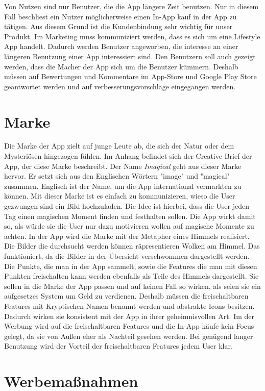 Von Nutzen sind nur Benutzer, die die App längere Zeit benutzen. Nur in diesem Fall beschliest ein Nutzer möglicherweise einen In-App kauf in der App zu tätigen. Aus diesem Grund ist die Kundenbindung sehr wichtig für unser Produkt. Im Marketing muss kommuniziert werden, dass es sich um eine Lifestyle App handelt. Dadurch werden Benutzer angeworben, die interesse an einer längeren Benutzung einer App interessiert sind.
Den Benutzern soll auch gezeigt werden, dass die Macher der App sich um die Benutzer kümmern. Deshalb müssen auf Bewertungen und Kommentare im App-Store und Google Play Store geantwortet werden und auf verbesserungsvorschläge eingegangen werden.

\section{Marke}

Die Marke der App zielt auf junge Leute ab, die sich der Natur oder dem Mysteriösen hingezogen fühlen. Im Anhang befindet sich der Creative Brief der App, der diese Marke beschreibt.
Der Name \textit{Imagical} geht aus dieser Marke hervor. Er setzt sich aus den Englischen Wörtern "image" und "magical" zusammen. Englisch ist der Name, um die App international vermarkten zu können.
Mit dieser Marke ist es einfach zu kommunizieren, wieso die User gezwungen sind ein Bild hochzuladen. Die Idee ist hierbei, dass die User jeden Tag einen magischen Moment finden und festhalten sollen. Die App wirkt damit so, als würde sie die User nur dazu motivieren wollen auf magische Momente zu achten.
In der App wird die Marke mit der Metapher eines Himmels realisiert. Die Bilder die durchsucht werden können räpresentieren Wolken am Himmel. Das funktioniert, da die Bilder in der Übersicht verschwommen dargestellt werden. Die Punkte, die man in der App sammelt, sowie die Features die man mit diesen Punkten freischalten kann werden ebenfalls als Teile des Himmels dargestellt. Sie sollen in die Marke der App passen und auf keinen Fall so wirken, als seien sie ein aufgesetzes System um Geld zu verdienen. Deshalb müssen die freischaltbaren Features mit Kryptischen Namen benannt werden und abstrakte Icons besitzen. Dadurch wirken sie konsistent mit der App in ihrer geheimnisvollen Art.
Im der Werbung wird auf die freischaltbaren Features und die In-App käufe kein Focus gelegt, da sie von Außen eher als Nachteil gesehen werden. Bei genügend langer Benutzung wird der Vorteil der freischaltbaren Features jedem User klar.

\section{Werbemaßnahmen}


